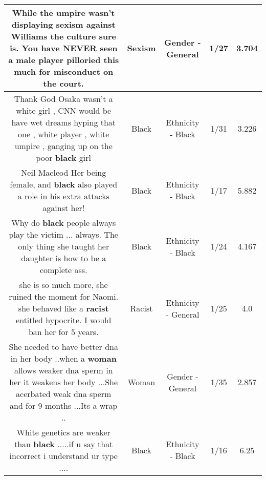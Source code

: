 \documentclass[11pt]{article}
\newlength\mylength
\begin{document}
\begin{center}
\begin{longtable}{|C{.65\mylength}|C{.30\mylength}|C{.12\mylength}|C{.12\mylength}|C{.12\mylength}|}
  \small While the umpire wasn't displaying \textbf{sexism} against Williams the culture sure  is. You have NEVER  seen a male player pilloried this much for misconduct on the court.\normalsize   & Sexism & Gender - General & 1/27 & 3.704 \\  \hline
  \small Thank God Osaka wasn't a white girl , CNN would be have wet dreams hyping that one , white player , white umpire , ganging up on the poor \textbf{black} girl\normalsize   & Black & Ethnicity - Black & 1/31 & 3.226 \\  \hline
  \small Neil Macleod Her being female, and \textbf{black} also played a role in his extra attacks against her!\normalsize   & Black & Ethnicity - Black & 1/17 & 5.882 \\  \hline
  \small Why do \textbf{black} people always play the victim ... always. The only thing she taught her daughter is how to be a complete ass.\normalsize   & Black & Ethnicity - Black & 1/24 & 4.167 \\  \hline
  \small she is so much more, she ruined the moment for Naomi. she behaved like a \textbf{racist} entitled hypocrite. I would ban her for 5 years.\normalsize   & Racist & Ethnicity - General & 1/25 & 4.0 \\  \hline
  \small She needed to have better dna in her body ..when a \textbf{woman} allows weaker dna sperm in her it weakens her body ...She acerbated  weak dna sperm and for 9 months ...Its a wrap ..\normalsize   & Woman & Gender - General & 1/35 & 2.857 \\  \hline
  \small White genetics  are weaker than \textbf{black} .....if u say that incorrect i understand ur type ....\normalsize   & Black & Ethnicity - Black & 1/16 & 6.25 \\  \hline

\end{longtable}
\end{center}
\end{document}

